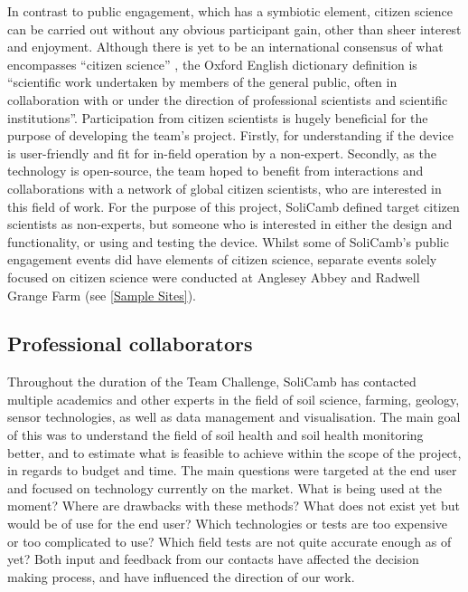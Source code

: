     
   
    
   In contrast to public engagement, which has a symbiotic element, citizen science can be carried out without any obvious participant gain, other than sheer interest and enjoyment. Although there is yet to be an international consensus of what encompasses \enquote{citizen science} \cite{heigl2019opinion}, the Oxford English dictionary definition is \enquote{scientific work undertaken by members of the general public, often in collaboration with or under the direction of professional scientists and scientific institutions}. Participation from citizen scientists is hugely beneficial for the purpose of developing the team's project. Firstly, for understanding if the device is user-friendly and fit for in-field operation by a non-expert. Secondly, as the technology is open-source, the team hoped to benefit from interactions and collaborations with a network of global citizen scientists, who are interested in this field of work. For the purpose of this project, SoliCamb defined target citizen scientists as non-experts, but someone who is interested in either the design and functionality, or using and testing the device. Whilst some of SoliCamb's public engagement events did have elements of citizen science, separate events solely focused on citizen science were conducted at Anglesey Abbey and Radwell Grange Farm (see \cref{Sample Sites}).
   
 
    \subsection{Professional collaborators} \label{Collaborators}
    Throughout the duration of the Team Challenge, SoliCamb has contacted multiple academics and other experts in the field of soil science, farming, geology, sensor technologies, as well as data management and visualisation. The main goal of this was to understand the field of soil health and soil health monitoring better, and to estimate what is feasible to achieve within the scope of the project, in regards to budget and time. The main questions were targeted at the end user and focused on technology currently on the market. What is being used at the moment? Where are drawbacks with these methods? What does not exist yet but would be of use for the end user? Which technologies or tests are too expensive or too complicated to use? Which field tests are not quite accurate enough as of yet? 
    Both input and feedback from our contacts have affected the decision making process, and have influenced the direction of our work. %
    
